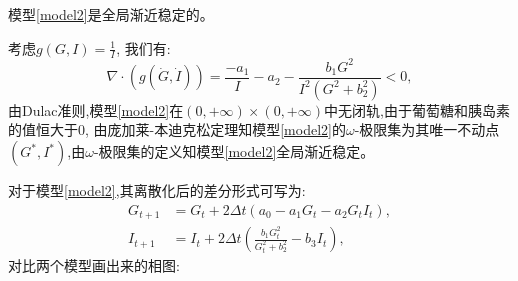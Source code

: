 \begin{prop}
    模型\ref{model2}是全局渐近稳定的。
\end{prop}
\begin{pf}
    考虑$g(G,I)=\frac{1}{I}$, 我们有:
    \begin{equation}
        \nabla\cdot(g(\dot{G},\dot{I}))=\frac{-a_1}{I}-a_2-\frac{b_1 G^2}{I^2(G^2 + b_2^2)}<0,
    \end{equation}
    由Dulac准则,模型\ref{model2}在$(0,+\infty)\times (0,+\infty)$中无闭轨,由于葡萄糖和胰岛素的值恒大于$0$, 由庞加莱-本迪克松定理知模型\ref{model2}的$\omega$-极限集为其唯一不动点$(G^*,I^*)$,由$\omega$-极限集的定义知模型\ref{model2}全局渐近稳定。
\end{pf}
对于模型\ref{model2},其离散化后的差分形式可写为:
\begin{equation}
    \begin{aligned}
        G_{t+1} & = G_t + 2\Delta t(a_0-a_1G_t-a_2G_tI_t),  \\
        I_{t+1} & = I_t + 2\Delta t(\frac{b_1 G_t^2}{G_t^2 + b_2^2} - b_3 I_t),
    \end{aligned}
\end{equation}
对比两个模型画出来的相图:

